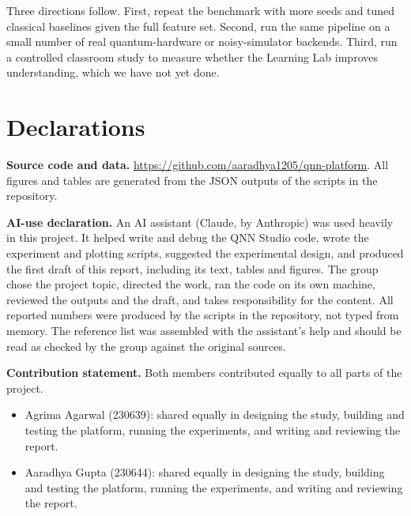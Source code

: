 \documentclass[conference]{IEEEtran}
\begin{document}
Three directions follow. First, repeat the benchmark with more seeds and tuned classical baselines given the full feature set. Second, run the same pipeline on a small number of real quantum-hardware or noisy-simulator backends. Third, run a controlled classroom study to measure whether the Learning Lab improves understanding, which we have not yet done.

\section*{Declarations}
\textbf{Source code and data.} \url{https://github.com/aaradhya1205/qnn-platform}. All figures and tables are generated from the JSON outputs of the scripts in the repository.

\textbf{AI-use declaration.} An AI assistant (Claude, by Anthropic) was used heavily in this project. It helped write and debug the QNN Studio code, wrote the experiment and plotting scripts, suggested the experimental design, and produced the first draft of this report, including its text, tables and figures. The group chose the project topic, directed the work, ran the code on its own machine, reviewed the outputs and the draft, and takes responsibility for the content. All reported numbers were produced by the scripts in the repository, not typed from memory. The reference list was assembled with the assistant's help and should be read as checked by the group against the original sources.

\textbf{Contribution statement.} Both members contributed equally to all parts of the project.
\begin{itemize}
  \item Agrima Agarwal (230639): shared equally in designing the study, building and testing the platform, running the experiments, and writing and reviewing the report.
  \item Aaradhya Gupta (230644): shared equally in designing the study, building and testing the platform, running the experiments, and writing and reviewing the report.
\end{itemize}



\end{document}
